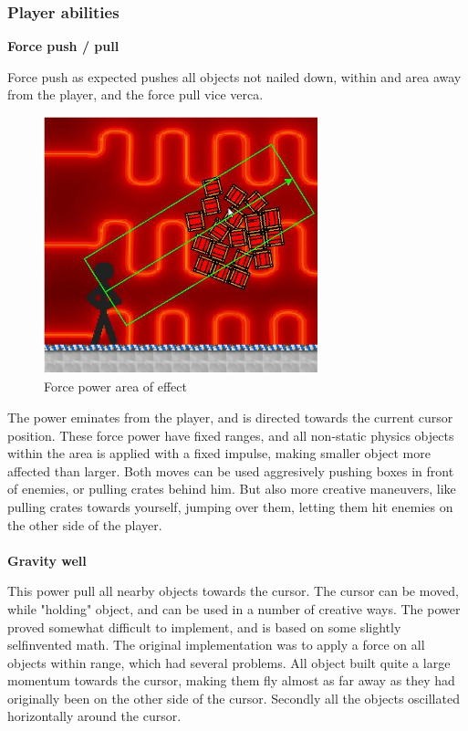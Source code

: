 \subsubsection{Player abilities}

\textbf{Force push / pull}

Force push as expected pushes all objects not nailed down, within and area away from the player, and the force pull vice verca.

\begin{figure}[h]
\begin{center}
 	\includegraphics[width=8cm]{pics/push}
	\caption{Force power area of effect}
	\label{fig:force}
\end{center}
\end{figure}

 The power eminates from the player, and is directed towards the current cursor position. These force power have fixed ranges, and all non-static physics objects within the area is applied with a fixed impulse, making smaller object more affected than larger. Both moves can be used aggresively pushing boxes in front of enemies, or pulling crates behind him. But also more creative maneuvers, like pulling crates towards yourself, jumping over them, letting them hit enemies on the other side of the player. 
\\ \\
\textbf{Gravity well}

This power pull all nearby objects towards the cursor. The cursor can be moved, while "holding" object, and can be used in a number of creative ways. The power proved somewhat difficult to implement, and is based on some slightly selfinvented math. The original implementation was to apply a force on all objects within range, which had several problems. All object built quite a large momentum towards the cursor, making them fly almost as far away as they had originally been on the other side of the cursor. Secondly all the objects oscillated horizontally around the cursor.

